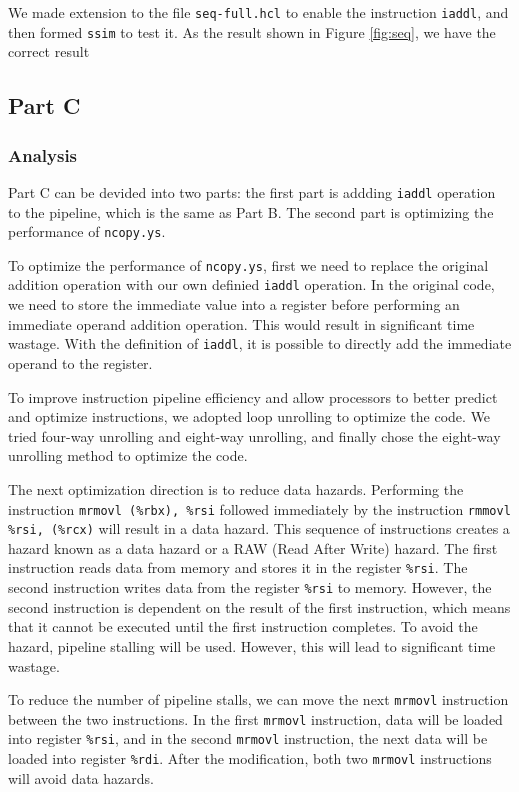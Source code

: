 \documentclass{article}
\begin{document}
We made extension to the file \verb |seq-full.hcl| to enable the instruction \verb |iaddl|, and then formed \verb |ssim| to test it. As the result shown in Figure \ref{fig:seq}, we have the correct result

\subsection{Part C}

\subsubsection{Analysis}

Part C can be devided into two parts: the first part is addding \verb|iaddl| operation to the pipeline, which is the same as Part B. The second part is optimizing the performance of \verb|ncopy.ys|.

To optimize the performance of \verb|ncopy.ys|, first we need to replace the original addition operation with our own definied \verb|iaddl| operation. In the original code, we need to store the immediate value into a register before performing an immediate operand addition operation. This would result in significant time wastage. With the definition of \verb|iaddl|, it is possible to directly add the immediate operand to the register.

To improve instruction pipeline efficiency and allow processors to better predict and optimize instructions, we adopted loop unrolling to optimize the code. We tried four-way unrolling and eight-way unrolling, and finally chose the eight-way unrolling method to optimize the code.

The next optimization direction is to reduce data hazards. Performing the instruction \verb|mrmovl (%rbx), %rsi| followed immediately by the instruction \verb|rmmovl %rsi, (%rcx)| will result in a data hazard. This sequence of instructions creates a hazard known as a data hazard or a RAW (Read After Write) hazard. The first instruction reads data from memory and stores it in the register \verb|%rsi|. The second instruction writes data from the register \verb|%rsi| to memory. However, the second instruction is dependent on the result of the first instruction, which means that it cannot be executed until the first instruction completes. To avoid the hazard, pipeline stalling will be used. However, this will lead to significant time wastage.

To reduce the number of pipeline stalls, we can move the next \verb|mrmovl| instruction between the two instructions. In the first \verb|mrmovl| instruction, data will be loaded into register \verb|%rsi|, and in the second \verb|mrmovl| instruction, the next data will be loaded into register \verb|%rdi|. After the modification, both two \verb|mrmovl| instructions will avoid data hazards.
\end{document}
